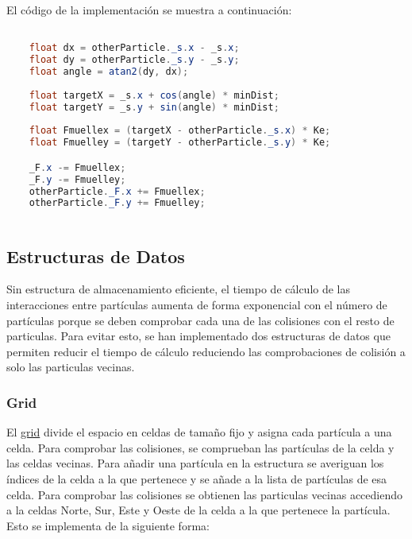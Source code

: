 \documentclass{article}
\begin{document}
El código de la implementación se muestra a continuación:

\begin{lstlisting}[language=Java, frame=single]

    float dx = otherParticle._s.x - _s.x;
    float dy = otherParticle._s.y - _s.y;
    float angle = atan2(dy, dx);
    
    float targetX = _s.x + cos(angle) * minDist;
    float targetY = _s.y + sin(angle) * minDist;
    
    float Fmuellex = (targetX - otherParticle._s.x) * Ke; 
    float Fmuelley = (targetY - otherParticle._s.y) * Ke;

    _F.x -= Fmuellex;
    _F.y -= Fmuelley;
    otherParticle._F.x += Fmuellex;
    otherParticle._F.y += Fmuelley;
    
\end{lstlisting}

\subsection{Estructuras de Datos}\label{sec:estructuras-datos}

Sin estructura de almacenamiento eficiente, el tiempo de cálculo de las interacciones entre partículas aumenta de forma exponencial con el número de partículas porque se deben comprobar cada una de las colisiones con el resto de particulas. Para evitar esto, se han implementado dos estructuras de datos que permiten reducir el tiempo de cálculo reduciendo las comprobaciones de colisión a solo las particulas vecinas.

\subsubsection{Grid}\label{sec:grid}

El \hyperref[sec:grid]{grid} divide el espacio en celdas de tamaño fijo y asigna cada partícula a una celda. Para comprobar las colisiones, se comprueban las partículas de la celda y las celdas vecinas. Para añadir una partícula en la estructura se averiguan los índices de la celda a la que pertenece y se añade a la lista de partículas de esa celda. Para comprobar las colisiones se obtienen las particulas vecinas accediendo a la celdas Norte, Sur, Este y Oeste de la celda a la que pertenece la partícula. Esto se implementa de la siguiente forma:
\end{document}
